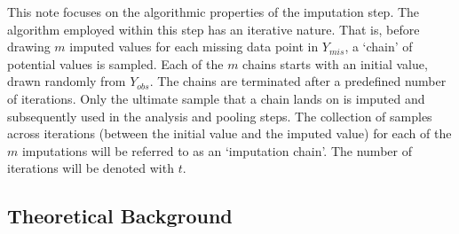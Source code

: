 \documentclass[article]{jss}
\begin{document}
This note focuses on the algorithmic properties of the imputation step. The algorithm employed within this step has an iterative nature. That is, before drawing $m$ imputed values for each missing data point in $Y_{mis}$, a `chain' of potential values is sampled. Each of the $m$ chains starts with an initial value, drawn randomly from $Y_{obs}$. The chains are terminated after a predefined number of iterations. Only the ultimate sample that a chain lands on is imputed and subsequently used in the analysis and pooling steps. The collection of samples across iterations (between the initial value and the imputed value) for each of the $m$ imputations will be referred to as an `imputation chain'. The number of iterations will be denoted with $t$.


% 
% 

\subsection{Theoretical Background} \label{sec:background}
\end{document}
